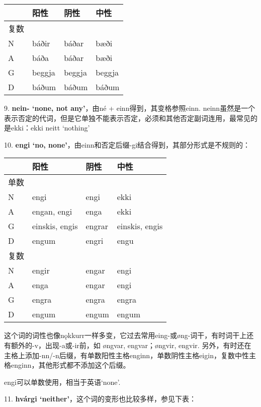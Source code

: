 \begin{longtable}{llll}
\toprule
 & 阳性 & 阴性 & 中性 \\
\midrule
\endhead
\bottomrule
\endfoot
复数 & & & \\
N & báðir & báðar & bæði \\
A & báða & báðar & bæði \\
G & beggja & beggja & beggja \\
D & báðum & báðum & báðum \\
\end{longtable}

9. \textbf{nein- `none, not any‌'}，由né + einn得到，其变格参照einn.
neinn虽然是一个表示否定的代词，但是它单独不能表示否定，必须和其他否定副词连用，最常见的是ekki：ekki
neitt `nothing'

10. \textbf{engi `no,
none‌'}，由einn和否定后缀-gi结合得到，其部分形式是不规则的：

\begin{longtable}{llll}
\toprule
 & 阳性 & 阴性 & 中性 \\
\midrule
\endhead
\bottomrule
\endfoot
单数 & & & \\
N & engi & engi & ekki \\
A & engan, engi & enga & ekki \\
G & einskis, engis & engrar & einskis, engis \\
D & engum & engri & engu \\
复数 & & & \\
N & engir & engar & engi \\
A & enga & engar & engi \\
G & engra & engra & engra \\
D & engum & engum & engum \\
\end{longtable}

这个词的词性也像nǫkkurr一样多变，它过去常用eing-或øng-词干，有时词干上还有额外的-v，出现-a或-ir前，如
øngvar, engvar；øngvir, engvir.
另外，有时还在主格上添加-nn/-n后缀，有单数阳性主格enginn，单数阴性主格eigin，复数中性主格enginn，其他形式都不添加这个后缀。

engi可以单数使用，相当于英语`none'.

11. \textbf{hvárgi `neither'}，这个词的变形也比较多样，参见下表：

